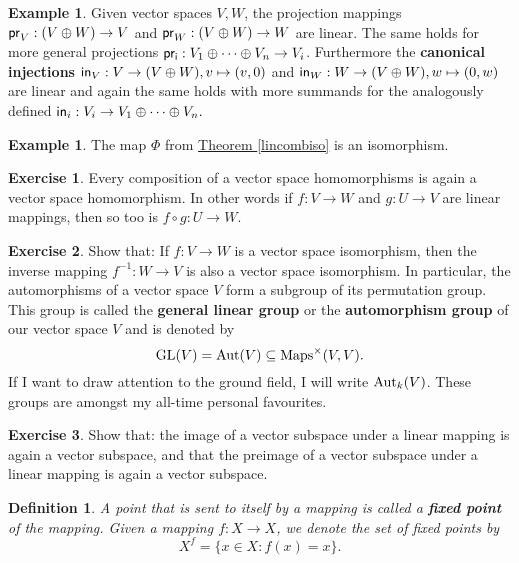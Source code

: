 \documentclass[11pt]{amsbook}
\newtheorem{definition}[theorem]{Definition}
\theoremstyle{definition}
\newtheorem{ex}[theorem]{Example}
\newtheorem{exercise}{Exercise}
\begin{document}
\begin{ex} Given vector spaces $V,W$, the projection mappings ${\sf pr}_V : (V\oplus W) \to V$ and ${\sf pr}_W : (V\oplus W) \to W$ are linear. The same holds for more general projections ${\sf pr_i} : V_1 \oplus \cdots \oplus V_n \to V_i$. Furthermore the {\bf canonical injections} ${\sf in}_V : V \to (V\oplus W), v\mapsto (v,0)$ and ${\sf in}_W : W \to (V\oplus W), w\mapsto (0,w)$ are linear and again the same holds with more summands for the analogously defined ${\sf in}_i: V_i \to V_1 \oplus \cdots \oplus V_n.$
\end{ex}

\begin{ex}
The map $\Phi$ from \hyperref[lincombiso]{Theorem \ref{lincombiso}} is an isomorphism. 
\end{ex}

\begin{exercise} \label{linmapcomp} Every composition of a vector space homomorphisms is again a vector space homomorphism. In other words if $f: V\to W$ and $g: U\to V$ are linear mappings, then so too is $f\circ g: U \to W$.
\end{exercise}

\begin{exercise} \label{linmapiso} Show that: If $f: V \to W$ is a vector space isomorphism, then the inverse mapping $f^{-1}: W\to V$ is also a vector space isomorphism. In particular, the automorphisms of a vector space $V$ form a subgroup of its permutation group. This group is called the {\bf general linear group} or the {\bf automorphism group} of our vector space $V$ and is denoted by $${\rm GL}(V) = {\rm Aut}(V) \subseteq {\rm Maps}^{\times}(V,V).$$ If I want to draw attention to the ground field, I will write ${\rm Aut}_k(V)$. These groups are amongst my all-time personal favourites.
\end{exercise}

\begin{exercise}\label{imageissub} Show that: the image of a vector subspace under a linear mapping is again a vector subspace, and that the preimage of a vector subspace under a linear mapping is again a vector subspace.
\end{exercise}

\begin{definition}\label{fixer} A point that is sent to itself by a mapping is called a {\bf fixed point} of the mapping. Given a mapping $f:X \to X$, we denote the set of fixed points by $$X^f = \{ x\in X : f(x) = x \}.$$
\end{definition}
\end{document}

